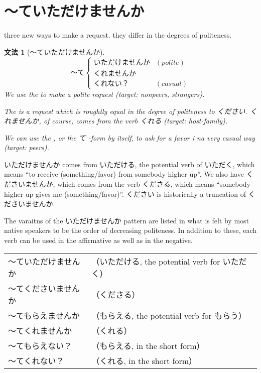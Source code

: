 \documentclass[notoc,notitlepage]{tufte-book}
\newtheorem{grammar}{\faBook \enspace 文法}[section]
\begin{document}

\section{〜ていただけませんか}%
\label{sec:_teitadakemasenka}

 three new ways to make a request. they differ in the degrees of politeness.

\begin{grammar}[〜ていただけませんか]
  \begin{equation*}
    〜て \begin{cases}
      いただけませんか & (polite) \\
      くれませんか     & \\
      くれない？       & (casual)
    \end{cases}
  \end{equation*}
  We use the  to make a polite request (target: nonpeers, strangers).

  The  is a request which is roughtly equal in the degree of politeness to ください. くれませんか, of course, comes from the verb くれる (target: host-family).

  We can use the , or the て -form by itself, to ask for a favor i na very casual way (target: peers).
\end{grammar}

\begin{note}
  いただけませんか comes from いただける, the potential verb of いただく, which means ``to receive (something/favor) from somebody higher up''. We also have くださいませんか, which comes from the verb くださる, which means ``somebody higher up gives me (something/favor)''. ください is historically a truncation of くださいませんか.

  The varaitns of the いただけませんか pattern are listed in what is felt by most native speakers to be the order of decreasing politeness. In addition to these, each verb can be used in the affirmative as well as in the negative.

  \begin{tabular}{l l}
    〜ていただけませんか & （いただける, the potential verb for いただく）\\
    〜てくださいませんか & （くださる）\\
    〜てもらえませんか & （もらえる, the potential verb for もらう）\\
    〜てくれませんか & （くれる）\\
    〜てもらえない？ & （もらえる, in the short form）\\
    〜てくれない？ & （くれる, in the short form）
  \end{tabular}
\end{note}
\end{document}

